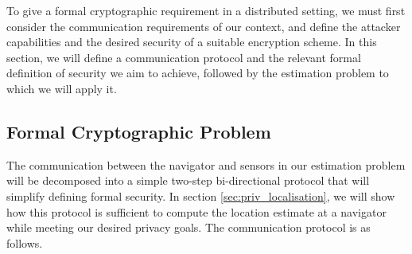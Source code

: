 \documentclass[10pt,letterpaper,oneside,twocolumn,journal]{IEEEtran}
\theoremstyle{definition}
\theoremstyle{definition}
\theoremstyle{remark}
\begin{document}
To give a formal cryptographic requirement in a distributed setting, we must first consider the communication requirements of our context, and define the attacker capabilities and the desired security of a suitable encryption scheme. In this section, we will define a communication protocol and the relevant formal definition of security we aim to achieve, followed by the estimation problem to which we will apply it.

% 
% 

\subsection{Formal Cryptographic Problem} \label{subsec:crypto_problem}
The communication between the navigator and sensors in our estimation problem will be decomposed into a simple two-step bi-directional protocol that will simplify defining formal security. In section \ref{sec:priv_localisation}, we will show how this protocol is sufficient to compute the location estimate at a navigator while meeting our desired privacy goals. The communication protocol is as follows.
\end{document}
